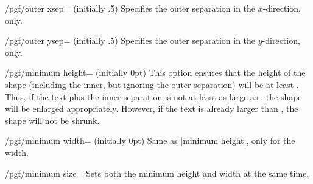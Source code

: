 \begin{key}{/pgf/outer xsep= (initially .5\string\pgflinewidth)}
  Specifies the outer separation in the $x$-direction, only.
\end{key}

\begin{key}{/pgf/outer ysep= (initially .5\string\pgflinewidth)}
  Specifies the outer separation in the $y$-direction, only.
\end{key}

\begin{key}{/pgf/minimum height= (initially 0pt)}
  This option ensures that the height of the shape (including the
  inner, but ignoring the outer separation) will be at least
  . Thus, if the text plus the inner separation is not
  at least as large as , the shape will be enlarged
  appropriately. However, if the text is already larger than
  , the shape will not be shrunk.
\begin{codeexample}[]
\end{codeexample}
\end{key}

\begin{key}{/pgf/minimum width= (initially 0pt)}
  Same as |minimum height|, only for the width.
\begin{codeexample}[]
\end{codeexample}
\end{key}

\begin{key}{/pgf/minimum size=}
  Sets both the minimum height and width at the same time.
\begin{codeexample}[]
\end{codeexample}
\end{key}

